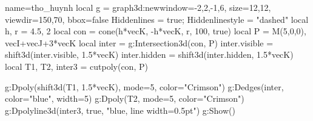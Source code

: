 \documentclass[12pt,border=2mm]{standalone}
\begin{document}
\begin{luadraw}{name=tho_huynh}
local g = graph3d:new{window={-2,2,-1,6}, size={12,12}, viewdir={150,70}, bbox=false}
Hiddenlines = true; Hiddenlinestyle = "dashed"
local h, r = 4.5, 2
local con = cone(h*vecK, -h*vecK, r, 100, true)
local P = {M(5,0,0), vecI+vecJ+3*vecK}
local inter = g:Intersection3d(con, P)
inter.visible = shift3d(inter.visible, 1.5*vecK)
inter.hidden = shift3d(inter.hidden, 1.5*vecK)
local T1, T2, inter3 = cutpoly(con, P)

g:Dpoly(shift3d(T1, 1.5*vecK), {mode=5, color="Crimson"})
g:Dedges(inter, {color="blue", width=5})
g:Dpoly(T2, {mode=5, color="Crimson"})
g:Dpolyline3d(inter3, true, "blue, line width=0.5pt")
g:Show()
\end{luadraw}
\end{document}
